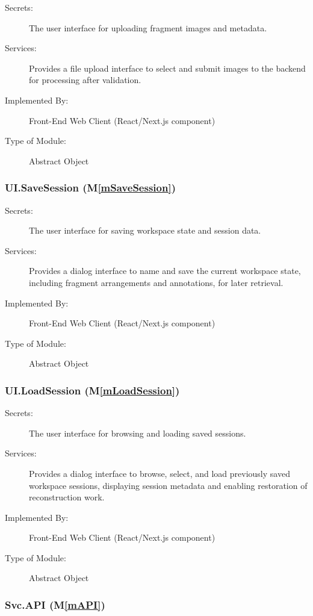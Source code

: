 \documentclass[12pt, titlepage]{article}
\newcommand{\mref}[1]{M\ref{#1}}
\begin{document}
\begin{description}
\item[Secrets:] The user interface for uploading fragment images and metadata.
\item[Services:] Provides a file upload interface to select and submit images to the backend for processing after validation.
\item[Implemented By:] Front-End Web Client (React/Next.js component)
\item[Type of Module:] Abstract Object
\end{description}

\subsubsection{UI.SaveSession (\mref{mSaveSession})}

\begin{description}
\item[Secrets:] The user interface for saving workspace state and session data.
\item[Services:] Provides a dialog interface to name and save the current workspace state, including fragment arrangements and annotations, for later retrieval.
\item[Implemented By:] Front-End Web Client (React/Next.js component)
\item[Type of Module:] Abstract Object
\end{description}

\subsubsection{UI.LoadSession (\mref{mLoadSession})}

\begin{description}
\item[Secrets:] The user interface for browsing and loading saved sessions.
\item[Services:] Provides a dialog interface to browse, select, and load previously saved workspace sessions, displaying session metadata and enabling restoration of reconstruction work.
\item[Implemented By:] Front-End Web Client (React/Next.js component)
\item[Type of Module:] Abstract Object
\end{description}

\subsubsection{Svc.API (\mref{mAPI})}
\end{document}
